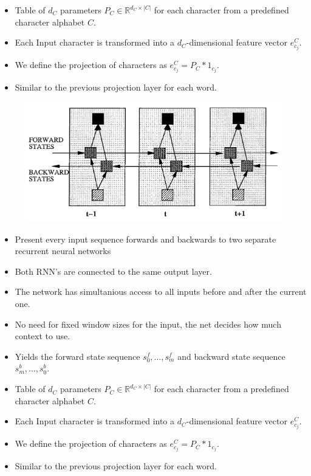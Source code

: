 \documentclass[11pt, a4paper, landscape]{article}
\begin{document}
\vfill
\begin{itemize}
  \item Table of $d_C$ parameters $P_C \in \mathbb{R}^{d_C \times |C|}$ for each character from a predefined character alphabet $C$.
  \item Each Input character is transformed into a $d_C$-dimensional feature vector $e_{c_j}^C$.
  \item We define the projection of characters as $e_{c_j}^C = P_C * 1_{c_j}$.
  \item Similar to the previous projection layer for each word.
\end{itemize}
\vfill

\NewPage{}

\vfill
\begin{figure}[H]
\begin{center}
  \includegraphics[width=.5\linewidth]{../article/img/brnn-unfolded}
\end{center}
\end{figure}
\begin{itemize}
\item Present every input sequence forwards and backwards to two separate recurrent neural networks 
\item Both RNN's are connected to the same output layer.
\item The network has simultanious access to all inputs before and after the current one.
\item No need for fixed window sizes for the input, the net decides how much context to use.
\item Yields the forward state sequence $s_{0}^f, \dots, s_{m}^f$ and backward state sequence $s_{m}^b, \dots, s_{0}^b$.
\end{itemize}
\vfill

\NewPage{}

\begin{itemize}
  \item Table of $d_C$ parameters $P_C \in \mathbb{R}^{d_C \times |C|}$ for each character from a predefined character alphabet $C$.
  \item Each Input character is transformed into a $d_C$-dimensional feature vector $e_{c_j}^C$.
  \item We define the projection of characters as $e_{c_j}^C = P_C * 1_{c_j}$.
  \item Similar to the previous projection layer for each word.
\end{itemize}
\vfill
\end{document}
